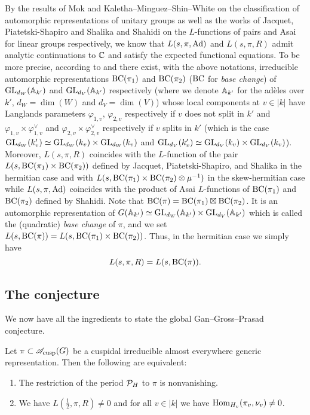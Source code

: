 By the results of Mok \cite{mok2015endoscopic} and Kaletha--Minguez--Shin--White \cite{kaletha2014endoscopic} on the classification of automorphic representations of unitary groups as well as the works of Jacquet, Piatetski-Shapiro and Shalika \cite{jacquet1983rankin} and Shahidi on the $L$-functions of pairs and Asai for linear groups respectively, we know that $L(s, \pi, \mathrm{Ad})$ and $L(s, \pi, R)$ admit analytic continuations to $\mathbb{C}$ and satisfy the expected functional equations.
To be more precise, according to \cite{mok2015endoscopic} and \cite{kaletha2014endoscopic} there exist, with the above notations, irreducible automorphic representations $\mathrm{BC}(\pi_1)$ and $\mathrm{BC}(\pi_2)$ ($\mathrm{BC}$ for \emph{base change}) of $\mathrm{GL}_{d_W}(\mathbb{A}_{k'})$ and $\mathrm{GL}_{d_V}(\mathbb{A}_{k'})$ respectively (where we denote $\mathbb{A}_{k'}$ for the ad\`eles over $k'$, $d_W = \dim(W)$ and $d_V = \dim(V)$) whose local components at $v \in |k|$ have Langlands parameters $\varphi_{1, v}$, $\varphi_{2, v}$ respectively if $v$ does not split in $k'$ and $\varphi_{1, v} \times \varphi_{1, v}^\vee$ and $\varphi_{2, v} \times \varphi_{2, v}^\vee$ respectively if $v$ splits in $k'$ (which is the case $\mathrm{GL}_{d_W}(k_v') \simeq \mathrm{GL}_{d_W}(k_v) \times \mathrm{GL}_{d_W}(k_v)$ and $\mathrm{GL}_{d_V}(k_v') \simeq \mathrm{GL}_{d_V}(k_v) \times \mathrm{GL}_{d_V}(k_v)$).
Moreover, $L(s, \pi, R)$ coincides with the $L$-function of the pair $L(s, \mathrm{BC}(\pi_1) \times \mathrm{BC}(\pi_2))$ defined by Jacquet, Piatetski-Shapiro, and Shalika \cite{jacquet1983rankin} in the hermitian case and with $L(s, \mathrm{BC}(\pi_1) \times \mathrm{BC}(\pi_2) \otimes \mu^{-1})$ in the skew-hermitian case while $L(s, \pi, \mathrm{Ad})$ coincides with the product of Asai $L$-functions of $\mathrm{BC}(\pi_1)$ and $\mathrm{BC}(\pi_2)$ defined by Shahidi.
Note that $\mathrm{BC}(\pi) = \mathrm{BC}(\pi_1) \boxtimes \mathrm{BC}(\pi_2)$.
It is an automorphic representation of $G(\mathbb{A}_{k'}) \simeq \mathrm{GL}_{d_W}(\mathbb{A}_{k'}) \times \mathrm{GL}_{d_V}(\mathbb{A}_{k'})$ which is called the (quadratic) \emph{base change} of $\pi$, and we set $L(s, \mathrm{BC}(\pi)) = L(s, \mathrm{BC}(\pi_1) \times \mathrm{BC}(\pi_2))$.
Thus, in the hermitian case we simply have
\[
    L(s, \pi, R) = L(s, \mathrm{BC}(\pi)).
\]


\subsection{The conjecture}

We now have all the ingredients to state the global Gan--Gross--Prasad conjecture.


\begin{conjecture}
\label{conj:global}
Let $\pi \subset \mathscr{A}_{\mathrm{cusp}}(G)$ be a cuspidal irreducible almost everywhere generic representation.
Then the following are equivalent:
\begin{enumerate}
    \item The restriction of the period $\mathcal{P}_H$ to $\pi$ is nonvanishing.
    \item We have $L(\frac{1}{2}, \pi, R) \neq 0$ and for all $v \in |k|$ we have $\mathrm{Hom}_{H_v}(\pi_v, \nu_v) \neq 0$.
\end{enumerate}
\end{conjecture}


